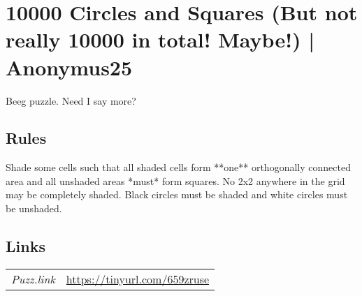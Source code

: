 \section[10000 Circles and Squares (But not really 10000 in total! Maybe!) | Anonymus25 {[\emph{Circles and Squares}]}]{10000 Circles and Squares (But not really 10000 in total! Maybe!) | {\normalfont Anonymus25}}
\label{sec:36-10000-circles-and-squares-but-not-really-10000-in-total-maybe-anonymus25}
Beeg puzzle. Need I say more?
\subsection*{Rules}
\begin{markdown}
Shade some cells such that all shaded cells form **one** orthogonally connected area and all unshaded areas *must* form squares. No 2x2 anywhere in the grid may be completely shaded. Black circles must be shaded and white circles must be unshaded.
\end{markdown}
\subsection*{Links}
\begin{tabularx}{\textwidth}{l X}
\emph{Puzz.link} & \url{https://tinyurl.com/659zruse} \\
\end{tabularx}
\pagebreak
